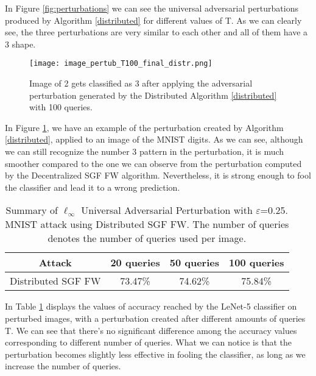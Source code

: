 In Figure \ref{fig:perturbations} we can see the universal adversarial perturbations produced by Algorithm \ref{distributed}
for different values of T. As we can clearly see, the three perturbations are very similar to each other and all of
them have a 3 shape.

\begin{figure}[htbp]
	\centering
	\texttt{[image: image\_pertub\_T100\_final\_distr.png]}
	\caption{{\small Image of 2 gets classified as 3 after applying the adversarial perturbation generated by the Distributed
	Algorithm \ref{distributed} with 100 queries.}}
	\label{fig:distributed}
\end{figure}

In Figure \ref{fig:distributed}, we have an example of the perturbation created by Algorithm \ref{distributed},
applied to an image of the MNIST digits. As we can see, although we can still recognize the number 3 pattern in the
perturbation, it is much smoother compared to the one we can observe from the perturbation computed by the Decentralized
SGF FW algorithm. Nevertheless, it is strong enough to fool the classifier and lead it to a wrong prediction.

\begin{table}[htbp]
	\begin{center}
		\begin{adjustwidth}{-.6cm}{}
			\begin{tabular}{c|ccc}
				\textbf{Attack} &          20 \textbf{queries} &      50 \textbf{queries} &     100 \textbf{queries} \\
				\midrule
				{\small Distributed SGF FW}     &   73.47\% &    74.62\% &       75.84\% \\
			\end{tabular}
		\end{adjustwidth}
	\end{center}
	\caption{{\small Summary of $\ell_\infty$ Universal Adversarial Perturbation with $\varepsilon$=0.25. MNIST attack using Distributed
	SGF FW. The number of queries denotes the number of queries used per image.}}
	\label{tab:distributed}
\end{table}

In Table \ref{tab:distributed} displays the values of accuracy reached by the LeNet-5 classifier on perturbed
images, with a perturbation created after different amounts of queries T. We can see that there's no significant
difference among the accuracy values corresponding to different number of queries. What we can notice is that the
perturbation becomes slightly less effective in fooling the classifier, as long as we increase the number of queries.